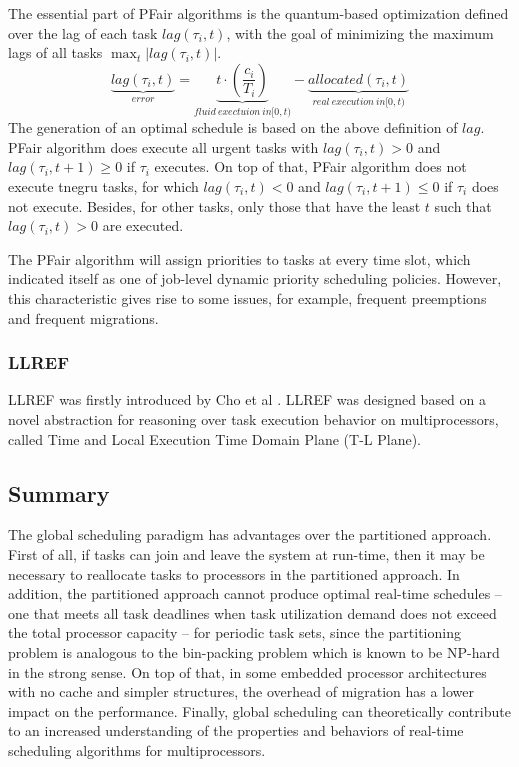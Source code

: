\documentclass[preprint,12pt]{elsarticle}
\begin{document}
The essential part of PFair algorithms is the quantum-based optimization
defined over the lag of each task $lag(\tau_i, t)$, with the goal of
minimizing the maximum lags of all tasks $\max_t|lag(\tau_i, t)|$.
\begin{equation}
    \underbrace{lag(\tau_i, t)}_{error} = 
    \underbrace{t \cdot (\frac{c_i}{T_i})}_{fluid\ exectuion\ in [0,t)} 
    - \underbrace{allocated(\tau_i, t)}_{real\ execution\ in [0,t)}
\end{equation}
The generation of an optimal schedule is based on the above definition of
$lag$. PFair algorithm does execute all urgent tasks with $lag(\tau_i, t) > 0$
and $lag(\tau_i, t +1) \geq 0$ if $\tau_i$ executes. 
On top of that, PFair algorithm does not execute tnegru tasks, for which
$lag(\tau_i, t) < 0$ and $lag(\tau_i, t+1) \leq 0$ if $\tau_i$ does not execute.  
Besides, for other tasks, only those that have the least $t$ such that
$lag(\tau_i,t) >0$ are executed.

The PFair algorithm will assign priorities to tasks at every time slot, which
indicated itself as one of job-level dynamic priority scheduling policies. 
However, this characteristic gives rise to some issues, for example, frequent
preemptions and frequent migrations.

\subsubsection{LLREF}
LLREF was firstly introduced by Cho et al \cite{cho2006optimal}. LLREF was
designed based on  a novel abstraction for reasoning over task execution
behavior on multiprocessors, called Time and Local Execution Time Domain
Plane (T-L Plane).

\subsection{Summary}
The global scheduling paradigm has advantages over the partitioned approach. 
First of all, if tasks can join and leave the system at run-time, then it may be
necessary to reallocate tasks to processors in the partitioned approach.
In addition, the partitioned approach cannot produce optimal
real-time schedules -- one that meets all task deadlines
when task utilization demand does not exceed the total processor
capacity -- for periodic task sets, since the partitioning
problem is analogous to the bin-packing problem which is known to be NP-hard
in the strong sense. 
On top of that, in some embedded processor architectures with no cache and
simpler structures, the overhead of migration has a lower
impact on the performance. 
Finally, global scheduling can theoretically contribute to an increased
understanding of the properties and behaviors of real-time scheduling
algorithms for multiprocessors.
\end{document}
